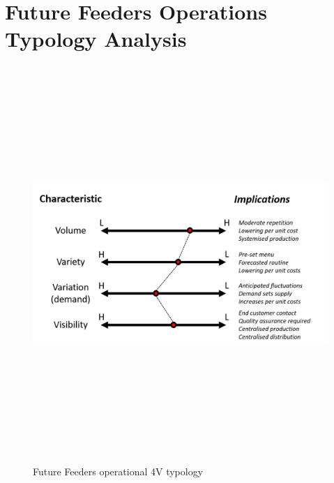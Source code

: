 \section{Future Feeders Operations Typology Analysis}
\label{app:4v}

\begin{figure}[H]
    \centering
    \includegraphics[angle=90, height=15cm]{4V.png}
    \caption{Future Feeders operational 4V typology \protect\cite[p. 21]{ops_book}}
    \label{fig:4v}
\end{figure}